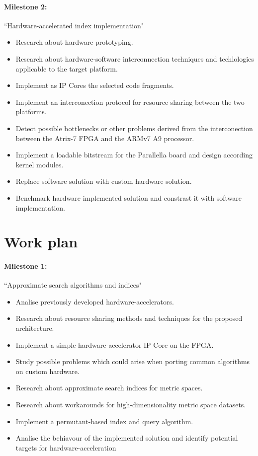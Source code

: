 \documentclass[11pt,letterpaper]{article}
\begin{document}
\paragraph{Milestone 2:} ``Hardware-accelerated index implementation"
\begin{itemize}
\item Research about hardware prototyping.
\item Research about hardware-software interconnection techniques and techlologies applicable to the target platform. 
\item Implement as IP Cores the selected code fragments.
\item Implement an interconection protocol for resource sharing between the two platforms.
\item Detect possible bottlenecks or other problems derived from the interconection between the Atrix-7 FPGA and the ARMv7 A9 processor.
\item Implement a loadable bitstream for the Parallella board and design according kernel modules.
\item Replace software solution with custom hardware solution.
\item Benchmark hardware implemented solution and constrast it with software implementation.
\end{itemize}

\section{Work plan}

\paragraph{Milestone 1:} ``Approximate search algorithms and indices"
\begin{itemize}
\item Analise previously developed hardware-accelerators.
\item Research about resource sharing methods and techniques for the proposed architecture.
\item Implement a simple hardware-accelerator IP Core on the FPGA.
\item Study possible problems which could arise when porting common algorithms on custom hardware.
\item Research about approximate search indices for metric spaces.
\item Research about workarounds for high-dimensionality metric space datasets.
\item Implement a permutant-based index and query algorithm.
\item Analise the behiavour of the implemented solution and identify potential targets for hardware-acceleration
\end{itemize}
\end{document}
